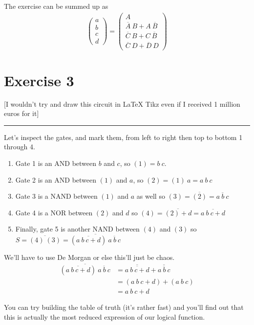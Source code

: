 \documentclass[a4paper,10pt]{article}
\def\centralruler{\begin{center}\rule{5cm}{.1pt}\end{center}}
\begin{document}
The exercise can be summed up as
\begin{align*}
\begin{pmatrix}a\\b\\c\\d\end{pmatrix} = \begin{pmatrix}A\\\overline{A}~B+A~\overline{B}\\\overline{C}~B+C~\overline{B}\\\overline{C}~D+\overline{D}~D\end{pmatrix}
\end{align*}

\section{Exercise 3}

[I wouldn't try and draw this circuit in LaTeX Tikz even if I received 1 million euros for it]
\centralruler

Let's inspect the gates, and mark them, from left to right then top to bottom 1 through 4.
\begin{enumerate}
	\item Gate 1 is an AND between $b$ and $c$, so $(1)=b~c$.
	\item Gate 2 is an AND between $(1)$ and $a$, so $(2)=(1)~a=a~b~c$
	\item Gate 3 is a NAND between $(1)$ and $a$ as well so $(3)=\overline{(2)}=\overline{a~b~c}$
	\item Gate 4 is a NOR between $(2)$ and $d$ so $(4)=\overline{(2)+d}=\overline{a~b~c+d}$
	\item Finally, gate 5 is another NAND between $(4)$ and $(3)$ so $S=\overline{(4)~(3)}=\overline{\left(\overline{a~b~c+d}\right)~\overline{a~b~c}}$
\end{enumerate}

We'll have to use De Morgan or else this'll just be chaos.
\begin{align*}
	\overline{\left(\overline{a~b~c+d}\right)~\overline{a~b~c}}&=\overline{\overline{a~b~c+d}}+\overline{\overline{a~b~c}}\\
								   &=(a~b~c+d)+(a~b~c)\\
								   &=a~b~c+d
\end{align*}

You can try building the table of truth (it's rather fast) and you'll find out that this is actually the most reduced expression of our logical function.
\end{document}
